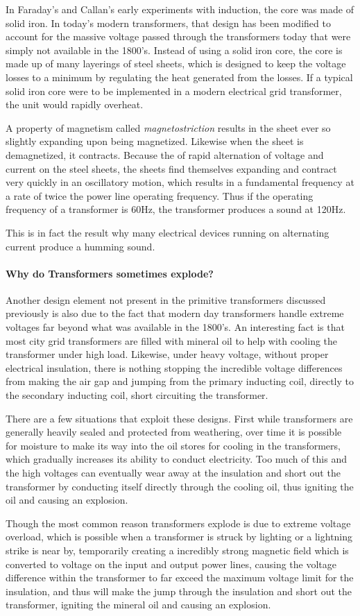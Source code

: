 \documentclass[12pt]{article}
\begin{document}
In Faraday's and Callan's early experiments with induction, the core was made of solid iron. In today's modern transformers, that design has been modified to account for the massive voltage passed through the transformers today that were simply not available in the 1800's. Instead of using a solid iron core, the core is made up of many layerings of steel sheets, which is designed to keep the voltage losses to a minimum by regulating the heat generated from the losses. If a typical solid iron core were to be implemented in a modern electrical grid transformer, the unit would rapidly overheat. 

A property of magnetism called \textit{magnetostriction} results in the sheet ever so slightly expanding upon being magnetized. Likewise when the sheet is demagnetized, it contracts. Because the of rapid alternation of voltage and current on the steel sheets, the sheets find themselves expanding and contract very quickly in an oscillatory motion, which results in a fundamental frequency at a rate of twice the power line operating frequency. Thus if the operating frequency of a transformer is 60Hz, the transformer produces a sound at 120Hz. 

This is in fact the result why many electrical devices running on alternating current produce a humming sound.


\paragraph{Why do Transformers sometimes explode?} Another design element not present in the primitive transformers discussed previously is also due to the fact that modern day transformers handle extreme voltages far beyond what was available in the 1800's. An interesting fact is that most city grid transformers are filled with mineral oil to help with cooling the transformer under high load. Likewise, under heavy voltage, without proper electrical insulation, there is nothing stopping the incredible voltage differences from making the air gap and jumping from the primary inducting coil, directly to the secondary inducting coil, short circuiting the transformer. 

There are a few situations that exploit these designs. First while transformers are generally heavily sealed and protected from weathering, over time it is possible for moisture to make its way into the oil stores for cooling in the transformers, which gradually increases its ability to conduct electricity. Too much of this and the high voltages can eventually wear away at the insulation and short out the transformer by conducting itself directly through the cooling oil, thus igniting the oil and causing an explosion.

Though the most common reason transformers explode is due to extreme voltage overload, which is possible when a transformer is struck by lighting or a lightning strike is near by, temporarily creating a incredibly strong magnetic field which is converted to voltage on the input and output power lines, causing the voltage difference within the transformer to far exceed the maximum voltage limit for the insulation, and thus will make the jump through the insulation and short out the transformer, igniting the mineral oil and causing an explosion. 
\end{document}
